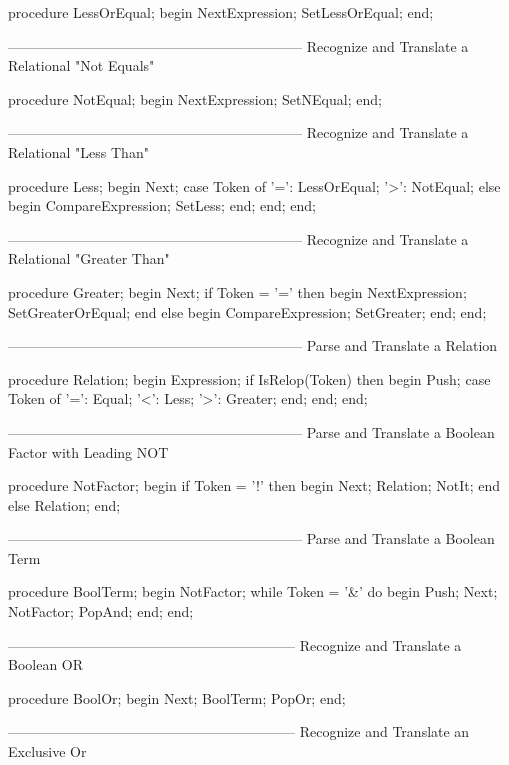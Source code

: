 \documentclass[float=false, crop=false]{standalone}
\begin{document}
\begin{code}
procedure LessOrEqual;
begin
   NextExpression;
   SetLessOrEqual;
end;


{---------------------------------------------------------------}
{ Recognize and Translate a Relational "Not Equals" }

procedure NotEqual;
begin
   NextExpression;
   SetNEqual;
end;


{---------------------------------------------------------------}
{ Recognize and Translate a Relational "Less Than" }

procedure Less;
begin
   Next;
   case Token of
     '=': LessOrEqual;
     '>': NotEqual;
   else begin
           CompareExpression;
           SetLess;
        end;
   end;
end;


{---------------------------------------------------------------}
{ Recognize and Translate a Relational "Greater Than" }

procedure Greater;
begin
   Next;
   if Token = '=' then begin
      NextExpression;
      SetGreaterOrEqual;
      end
   else begin
      CompareExpression;
      SetGreater;
   end;
end;


{---------------------------------------------------------------}
{ Parse and Translate a Relation }


procedure Relation;
begin
   Expression;
   if IsRelop(Token) then begin
      Push;
      case Token of
       '=': Equal;
       '<': Less;
       '>': Greater;
      end;
   end;
end;


{---------------------------------------------------------------}
{ Parse and Translate a Boolean Factor with Leading NOT }

procedure NotFactor;
begin
   if Token = '!' then begin
      Next;
      Relation;
      NotIt;
      end
   else
      Relation;
end;


{---------------------------------------------------------------}
{ Parse and Translate a Boolean Term }

procedure BoolTerm;
begin
   NotFactor;
   while Token = '&' do begin
      Push;
      Next;
      NotFactor;
      PopAnd;
   end;
end;


{--------------------------------------------------------------}
{ Recognize and Translate a Boolean OR }

procedure BoolOr;
begin
   Next;
   BoolTerm;
   PopOr;
end;


{--------------------------------------------------------------}
{ Recognize and Translate an Exclusive Or }


\end{code}
\end{document}
